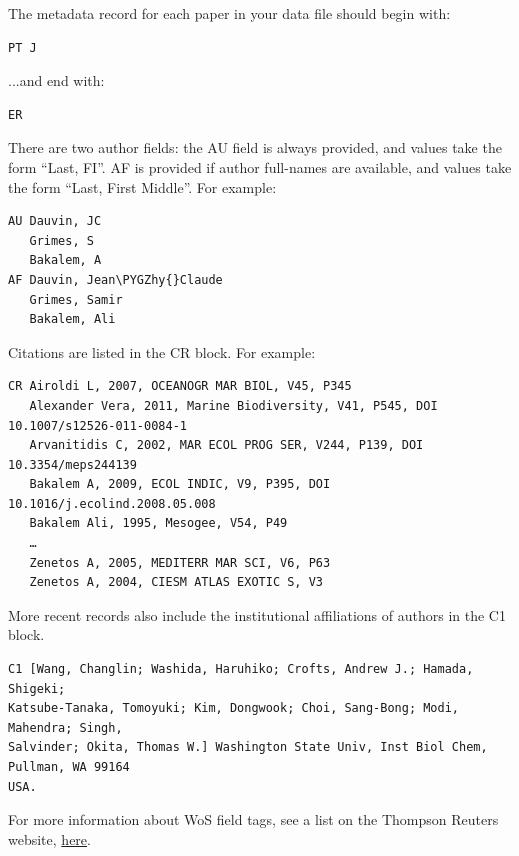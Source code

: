 \documentclass[letterpaper,10pt,english]{sphinxmanual}
\def\PYGZhy{\char`\-}
\begin{document}
The metadata record for each paper in your data file should begin with:

\begin{Verbatim}[commandchars=\\\{\}]
PT J
\end{Verbatim}

...and end with:

\begin{Verbatim}[commandchars=\\\{\}]
ER
\end{Verbatim}

There are two author fields: the AU field is always provided, and values take the form
``Last, FI''. AF is provided if author full-names are available, and values take the form
``Last, First Middle''. For example:

\begin{Verbatim}[commandchars=\\\{\}]
AU Dauvin, JC
   Grimes, S
   Bakalem, A
AF Dauvin, Jean\PYGZhy{}Claude
   Grimes, Samir
   Bakalem, Ali
\end{Verbatim}

Citations are listed in the CR block. For example:

\begin{Verbatim}[commandchars=\\\{\}]
CR Airoldi L, 2007, OCEANOGR MAR BIOL, V45, P345
   Alexander Vera, 2011, Marine Biodiversity, V41, P545, DOI 10.1007/s12526-011-0084-1
   Arvanitidis C, 2002, MAR ECOL PROG SER, V244, P139, DOI 10.3354/meps244139
   Bakalem A, 2009, ECOL INDIC, V9, P395, DOI 10.1016/j.ecolind.2008.05.008
   Bakalem Ali, 1995, Mesogee, V54, P49
   …
   Zenetos A, 2005, MEDITERR MAR SCI, V6, P63
   Zenetos A, 2004, CIESM ATLAS EXOTIC S, V3
\end{Verbatim}

More recent records also include the institutional affiliations of authors in the C1
block.

\begin{Verbatim}[commandchars=\\\{\}]
C1 [Wang, Changlin; Washida, Haruhiko; Crofts, Andrew J.; Hamada, Shigeki;
Katsube-Tanaka, Tomoyuki; Kim, Dongwook; Choi, Sang-Bong; Modi, Mahendra; Singh,
Salvinder; Okita, Thomas W.] Washington State Univ, Inst Biol Chem, Pullman, WA 99164
USA.
\end{Verbatim}

For more information about WoS field tags, see a list on the Thompson Reuters website,
\href{http://images.webofknowledge.com/WOKRS53B4/help/WOS/hs\_wos\_fieldtags.html}{here}.
\end{document}
